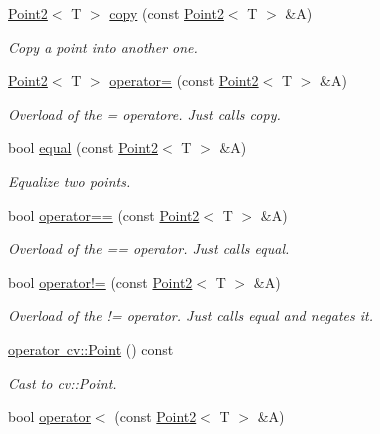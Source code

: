 \begin{DoxyCompactItemize}
\mbox{\hyperlink{class_point2}{Point2}}$<$ T $>$ \mbox{\hyperlink{class_point2_abf5cfefe8e75dda02f681fc8d74c2c39}{copy}} (const \mbox{\hyperlink{class_point2}{Point2}}$<$ T $>$ \&A)
\begin{DoxyCompactList}\small\item\em Copy a point into another one. \end{DoxyCompactList}\item 
\mbox{\hyperlink{class_point2}{Point2}}$<$ T $>$ \mbox{\hyperlink{class_point2_af715722f2b04def60eb23f291e31c4d8}{operator=}} (const \mbox{\hyperlink{class_point2}{Point2}}$<$ T $>$ \&A)
\begin{DoxyCompactList}\small\item\em Overload of the = operatore. Just calls {\ttfamily copy}. \end{DoxyCompactList}\item 
bool \mbox{\hyperlink{class_point2_a8ecda76875462077d1396319c8a582d5}{equal}} (const \mbox{\hyperlink{class_point2}{Point2}}$<$ T $>$ \&A)
\begin{DoxyCompactList}\small\item\em Equalize two points. \end{DoxyCompactList}\item 
bool \mbox{\hyperlink{class_point2_af58b2b05b59316580b3989b0548afade}{operator==}} (const \mbox{\hyperlink{class_point2}{Point2}}$<$ T $>$ \&A)
\begin{DoxyCompactList}\small\item\em Overload of the == operator. Just calls {\ttfamily equal}. \end{DoxyCompactList}\item 
bool \mbox{\hyperlink{class_point2_ad671e757853f5d7d5431d011d9e94b03}{operator!=}} (const \mbox{\hyperlink{class_point2}{Point2}}$<$ T $>$ \&A)
\begin{DoxyCompactList}\small\item\em Overload of the != operator. Just calls {\ttfamily equal} and negates it. \end{DoxyCompactList}\item 
\mbox{\hyperlink{class_point2_a0d3f17f7d86d02eae126aa329a20861a}{operator cv\+::\+Point}} () const
\begin{DoxyCompactList}\small\item\em Cast to cv\+::\+Point. \end{DoxyCompactList}\item 
bool \mbox{\hyperlink{class_point2_a636a84c47519a482cfce43039e981dff}{operator$<$}} (const \mbox{\hyperlink{class_point2}{Point2}}$<$ T $>$ \&A)

\end{DoxyCompactItemize}

